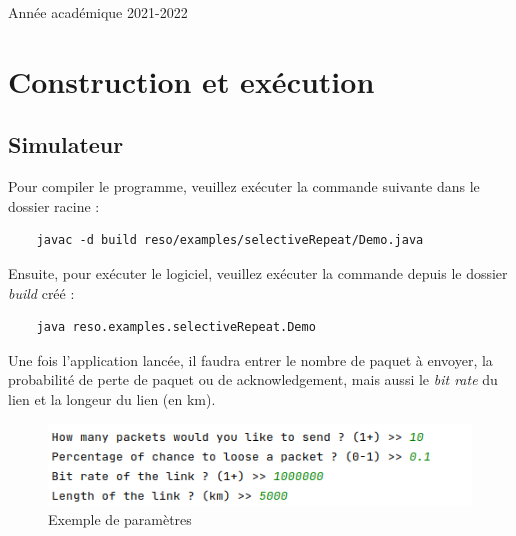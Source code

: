 \documentclass{article}
\begin{document}
\begin{titlepage}
\begin{center}
        {\large Année académique 2021-2022}
        
    \end{center}
\end{titlepage}

\newpage

\section{Construction et exécution}
\subsection{Simulateur}
Pour compiler le programme, veuillez exécuter la commande suivante dans le dossier racine :
\begin{verbatim}
    javac -d build reso/examples/selectiveRepeat/Demo.java
\end{verbatim}
Ensuite, pour exécuter le logiciel, veuillez exécuter la commande depuis le dossier \textit{build} créé :
\begin{verbatim}
    java reso.examples.selectiveRepeat.Demo
\end{verbatim}
Une fois l'application lancée, il faudra entrer le nombre de paquet à envoyer, la probabilité de perte
de paquet ou de acknowledgement, mais aussi le \textit{bit rate} du lien et la longeur du lien (en km).
\begin{figure}[h]
    \centering \includegraphics[scale=0.5]{data.png}
    \caption{Exemple de paramètres}
\end{figure}
\end{document}
